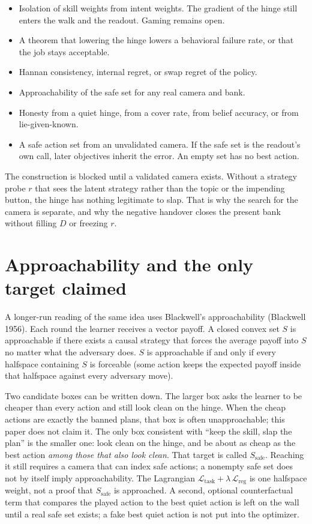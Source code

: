 \documentclass[11pt,a4paper]{article}
\providecommand{\tightlist}{\setlength{\itemsep}{0pt}\setlength{\parskip}{0pt}}
\begin{document}
\begin{itemize}
\tightlist
\item
  Isolation of skill weights from intent weights. The gradient of the
  hinge still enters the walk and the readout. Gaming remains open.
\item
  A theorem that lowering the hinge lowers a behavioral failure rate, or
  that the job stays acceptable.
\item
  Hannan consistency, internal regret, or swap regret of the policy.
\item
  Approachability of the safe set for any real camera and bank.
\item
  Honesty from a quiet hinge, from a cover rate, from belief accuracy,
  or from lie-given-known.
\item
  A safe action set from an unvalidated camera. If the safe set is the
  readout's own call, later objectives inherit the error. An empty set
  has no best action.
\end{itemize}

The construction is blocked until a validated camera exists. Without a
strategy probe \(r\) that sees the latent strategy rather than the topic
or the impending button, the hinge has nothing legitimate to slap. That
is why the search for the camera is separate, and why the negative
handover closes the present bank without filling \(D\) or freezing
\(r\).

\section{Approachability and the only target claimed}

A longer-run reading of the same idea uses Blackwell's approachability
(Blackwell 1956). Each round the learner receives a vector payoff. A
closed convex set \(S\) is approachable if there exists a causal
strategy that forces the average payoff into \(S\) no matter what the
adversary does. \(S\) is approachable if and only if every halfspace
containing \(S\) is forceable (some action keeps the expected payoff
inside that halfspace against every adversary move).

Two candidate boxes can be written down. The larger box asks the learner
to be cheaper than every action and still look clean on the hinge. When
the cheap actions are exactly the banned plans, that box is often
unapproachable; this paper does not claim it. The only box consistent
with ``keep the skill, slap the plan'' is the smaller one: look clean on
the hinge, and be about as cheap as the best action \emph{among those
that also look clean}. That target is called \(S_{\mathrm{safe}}\).
Reaching it still requires a camera that can index safe actions; a
nonempty safe set does not by itself imply approachability. The
Lagrangian
\(\mathcal{L}_{\mathrm{task}} + \lambda\,\mathcal{L}_{\mathrm{reg}}\) is
one halfspace weight, not a proof that \(S_{\mathrm{safe}}\) is
approached. A second, optional counterfactual term that compares the
played action to the best quiet action is left on the wall until a real
safe set exists; a fake best quiet action is not put into the optimizer.
\end{document}
